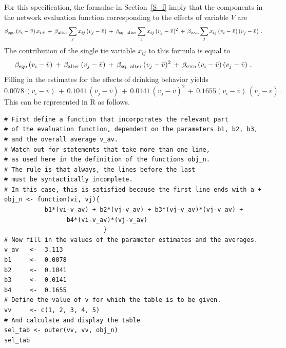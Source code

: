 \documentclass[a4paper,fleqn,11pt]{article}
\newcommand{\+}{\, + \,}
\newcommand{\R}{{\sf R }}
\begin{document}
For this specification, the formulae in Section~\ref{S_f} imply that the
components in the network evaluation function corresponding to the effects
of variable $V$ are
\begin{equation}
 \beta_{\rm ego}\, (v_i - \bar v) \, x_{i+}
           \, + \, \beta_{\rm alter}  \sum_j x_{ij}\, (v_j - \bar v)
 \, + \, \beta_{\rm sq.\ alter}  \sum_j x_{ij}\, (v_j - \bar v)^2  \, + \,
   \beta_{\rm e \times a}  \sum_j x_{ij}\,(v_i - \bar v) \,(v_j - \bar v)  \ .
        \label{eq_contr2_V}
\end{equation}
The contribution of the single tie variable $x_{ij}$ to this formula
is equal to
\begin{equation}
  \beta_{\rm ego}\, (v_i - \bar v)
         \, + \, \beta_{\rm alter}\,  (v_j - \bar v) \, + \,
      \beta_{\rm sq.\ alter}  \, (v_j - \bar v)^2  \,+\,
        \beta_{\rm e \times a} \, (v_i - \bar v)\, (v_j - \bar v) \ .
                 \label{eq_sel2}
\end{equation}
Filling in the estimates for the effects of drinking behavior yields
\[
  0.0078 \, (v_i - \bar v)  \, + \,  0.1041 \, (v_j - \bar v) \, + \,
      0.0141 \, (v_j - \bar v)^2
           \,+\,  0.1655   (v_i - \bar v)\, (v_j - \bar v) \ .
\]
This can be represented in \R as follows.
\begin{footnotesize}
\begin{verbatim}
# First define a function that incorporates the relevant part
# of the evaluation function, dependent on the parameters b1, b2, b3,
# and the overall average v_av.
# Watch out for statements that take more than one line,
# as used here in the definition of the functions obj_n.
# The rule is that always, the lines before the last
# must be syntactically incomplete.
# In this case, this is satisfied because the first line ends with a +
obj_n <- function(vi, vj){
           b1*(vi-v_av) + b2*(vj-v_av) + b3*(vj-v_av)*(vj-v_av) +
                 b4*(vi-v_av)*(vj-v_av)
                           }
# Now fill in the values of the parameter estimates and the averages.
v_av   <-  3.113
b1     <-  0.0078
b2     <-  0.1041
b3     <-  0.0141
b4     <-  0.1655
# Define the value of v for which the table is to be given.
vv     <- c(1, 2, 3, 4, 5)
# And calculate and display the table
sel_tab <- outer(vv, vv, obj_n)
sel_tab
\end{verbatim}
\end{footnotesize}
\end{document}
